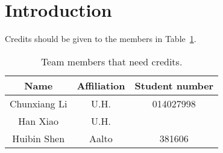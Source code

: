 
\section{Introduction}

Credits should be given to the members in Table~\ref{member_credit}.

\begin{table}[ht]
	\begin{center}
		\begin{tabular}{|c|c|c|} \hline
			\textbf{Name} & \textbf{Affiliation} & \textbf{Student number} \\ \hline
			Chunxiang Li & U.H. & 014027998\\ \hline
			Han Xiao & U.H. & \\ \hline
			Huibin Shen & Aalto & 381606 \\ \hline
		\end{tabular}
	\end{center}
	\caption{Team members that need credits.}
	\label{member_credit}
\end{table}
